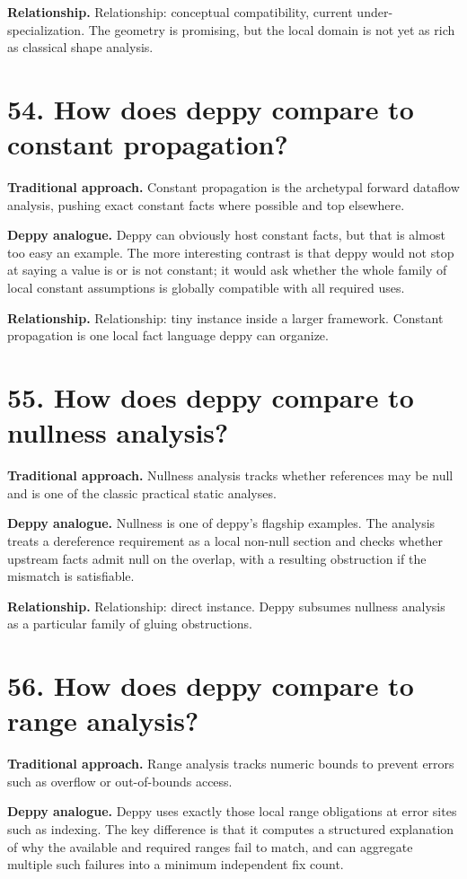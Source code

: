 \documentclass[11pt,openany]{book}
\begin{document}
\textbf{Relationship.} Relationship: conceptual compatibility, current under-specialization. The geometry is promising, but the local domain is not yet as rich as classical shape analysis.

\section*{54. How does deppy compare to constant propagation?}
\textbf{Traditional approach.} Constant propagation is the archetypal forward dataflow analysis, pushing exact constant facts where possible and top elsewhere.

\textbf{Deppy analogue.} Deppy can obviously host constant facts, but that is almost too easy an example. The more interesting contrast is that deppy would not stop at saying a value is or is not constant; it would ask whether the whole family of local constant assumptions is globally compatible with all required uses.

\textbf{Relationship.} Relationship: tiny instance inside a larger framework. Constant propagation is one local fact language deppy can organize.

\section*{55. How does deppy compare to nullness analysis?}
\textbf{Traditional approach.} Nullness analysis tracks whether references may be null and is one of the classic practical static analyses.

\textbf{Deppy analogue.} Nullness is one of deppy's flagship examples. The analysis treats a dereference requirement as a local non-null section and checks whether upstream facts admit null on the overlap, with a resulting obstruction if the mismatch is satisfiable.

\textbf{Relationship.} Relationship: direct instance. Deppy subsumes nullness analysis as a particular family of gluing obstructions.

\section*{56. How does deppy compare to range analysis?}
\textbf{Traditional approach.} Range analysis tracks numeric bounds to prevent errors such as overflow or out-of-bounds access.

\textbf{Deppy analogue.} Deppy uses exactly those local range obligations at error sites such as indexing. The key difference is that it computes a structured explanation of why the available and required ranges fail to match, and can aggregate multiple such failures into a minimum independent fix count.
\end{document}
